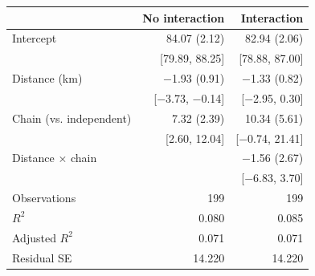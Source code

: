 \begin{tabular}{lrr}
  \toprule
  & No interaction & Interaction \\ 
  \midrule
Intercept & 84.07 (2.12) & 82.94 (2.06) \\ 
   & [79.89, 88.25] & [78.88, 87.00] \\ 
  Distance (km) & $-$1.93 (0.91) & $-$1.33 (0.82) \\ 
   & [$-$3.73, $-$0.14] & [$-$2.95, 0.30] \\ 
  Chain (vs. independent) & 7.32 (2.39) & 10.34 (5.61) \\ 
   & [2.60, 12.04] & [$-$0.74, 21.41] \\ 
  Distance $\times$ chain &  & $-$1.56 (2.67) \\ 
   &  & [$-$6.83, 3.70] \\ 
  Observations & 199 & 199 \\ 
  $R^2$ & 0.080 & 0.085 \\ 
  Adjusted $R^2$ & 0.071 & 0.071 \\ 
  Residual SE & 14.220 & 14.220 \\ 
   \bottomrule
\end{tabular}
